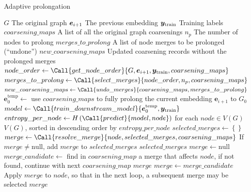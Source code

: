 \begin{algorithm*}
  \caption{Adaptive prolongation}
  \label{alg:adaptive-prolongation}
  \begin{algorithmic}
    \Require $ G $ \Comment The original graph
    \Require $ \bm{e}_{i+1} $ \Comment The previous embedding
    \Require $ \bm{y}_\mathrm{train} $ \Comment Training labels
    \Require $ coarsening\_maps $ \Comment A list of all the original graph coarsenings
    \Require $ n_p $ \Comment The number of nodes to prolong
    \Ensure $ merges\_to\_prolong $ \Comment A list of node merges to be prolonged (\enquote{undone})
    \Ensure $ new\_coarsening\_maps $ \Comment Updated coarsening records without the prolonged merges
    \Statex
    \State $ node\_order \gets \Call{get\_node\_order}{G, \bm{e}_{i+1}, \bm{y}_\mathrm{train}, coarsening\_maps} $
    \State $ merges\_to\_prolong \gets \Call{select\_merges}{node\_order, n_p, coarsening\_maps} $
    \State $ new\_coarsening\_maps \gets \Call{undo\_merges}{coarsening\_maps, merges\_to\_prolong} $
    \Statex
        \State $ \bm{e}_0^\mathrm{temp} \gets $ use $ coarsening\_maps $ to fully prolong the current embedding $ \bm{e}_{i+1} $ to $ G_0 $
        \State $ model \gets \Call{train\_downstream\_model}{\bm{e}_0^\mathrm{temp}, \bm{y}_\mathrm{train}} $
        \State $ entropy\_per\_node \gets H \left( \Call{predict}{model, node} \right) $ for each $ node \in V \left( G \right) $
        \State \Return $ V \left( G \right) $, sorted in descending order by $ entropy\_per\_node $
    \EndFunction
    \Statex
        \State $ selected\_merges \gets \left\{ \right\} $
            \State $ merge \gets \Call{resolve\_merge}{node, selected\_merges, coarsening\_maps} $
            \State If $ merge \neq \mathrm{null} $, add $ merge $ to $ selected\_merges $
        \EndFor
        \State \Return $ selected\_merges $
    \EndFunction
    \Statex
        \State $ merge \gets \mathrm{null} $
            \State $ merge\_candidate \gets $ find in $ coarsening\_map $ a merge that affects $ node $, if not found, continue with next $ coarsening\_map $
                \State \Return $ merge $
            \EndIf
            \State $ merge \gets merge\_candidate $
            \State Apply $ merge $ to $ node $, so that in the next loop, a subsequent merge may be selected
        \EndFor
        \State \Return $ merge $
    \EndFunction
  \end{algorithmic}
\end{algorithm*}

